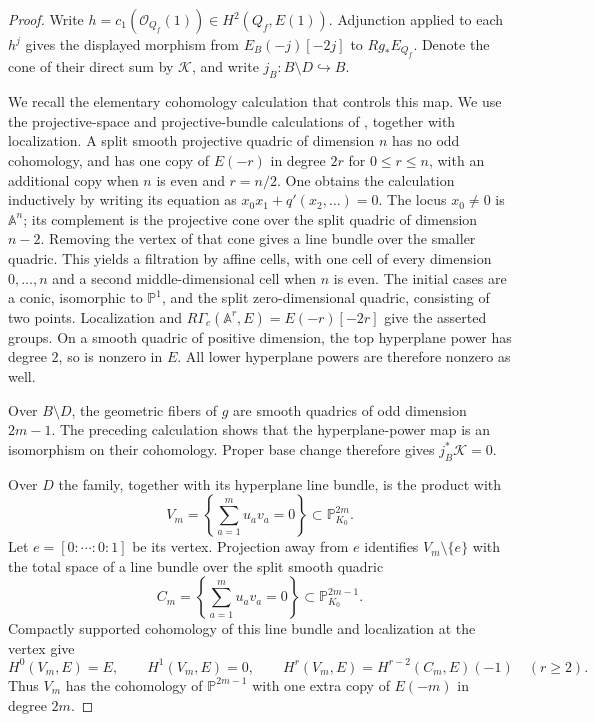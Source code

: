 \begin{proof}
Write $h=c_1(\mathcal O_{Q_f}(1))\in H^2(Q_f,E(1))$.
Adjunction applied to each $h^j$ gives the displayed morphism from
$E_B(-j)[-2j]$ to $Rg_*E_{Q_f}$.  Denote the cone of their direct sum
by $\mathcal K$, and write $j_B:B\setminus D\hookrightarrow B$.

We recall the elementary cohomology calculation that controls this map.
We use the projective-space and projective-bundle calculations of
\cite[Example~16.3 and Theorem~23.2]{MilneEtale}, together with localization.
A split smooth projective quadric of dimension $n$ has no odd
cohomology, and has one copy of $E(-r)$ in degree $2r$ for
$0\leq r\leq n$, with an additional copy when $n$ is even and
$r=n/2$.  One obtains the calculation inductively by writing its
equation as $x_0x_1+q'(x_2,\ldots)=0$.  The locus $x_0\ne0$ is
$\mathbb A^n$; its complement is the projective cone over the split
quadric of dimension $n-2$.  Removing the vertex of that cone gives a
line bundle over the smaller quadric.  This yields a filtration by
affine cells, with one cell of every dimension $0,\ldots,n$ and a
second middle-dimensional cell when $n$ is even.  The initial cases
are a conic, isomorphic to $\mathbb P^1$, and the split
zero-dimensional quadric, consisting of two points.  Localization and
$R\Gamma_c(\mathbb A^r,E)=E(-r)[-2r]$ give the asserted groups.
On a smooth quadric of positive dimension, the top hyperplane power
has degree $2$, so is nonzero in $E$.  All lower hyperplane powers are
therefore nonzero as well.

Over $B\setminus D$, the geometric fibers of $g$ are smooth quadrics
of odd dimension $2m-1$.  The preceding calculation shows that the
hyperplane-power map is an isomorphism on their cohomology.  Proper
base change therefore gives $j_B^*\mathcal K=0$.

Over $D$ the family, together with its hyperplane line bundle, is the
product with
\[
 V_m=\left\{\sum_{a=1}^{m}u_av_a=0\right\}
         \subset\mathbb P_{K_0}^{2m}.
\]
Let $e=[0:\cdots:0:1]$ be its vertex.  Projection away from $e$
identifies $V_m\setminus\{e\}$ with the total space of a line bundle
over the split smooth quadric
\[
 C_m=\left\{\sum_{a=1}^{m}u_av_a=0\right\}
         \subset\mathbb P_{K_0}^{2m-1}.
\]
Compactly supported cohomology of this line bundle and localization at
the vertex give
\begin{equation}\label{eq:slice-cone-cohomology}
 H^0(V_m,E)=E,\qquad H^1(V_m,E)=0,\qquad
 H^r(V_m,E)=H^{r-2}(C_m,E)(-1)\quad(r\geq2).
\end{equation}
Thus $V_m$ has the cohomology of $\mathbb P^{2m-1}$ with one extra
copy of $E(-m)$ in degree $2m$.


\end{proof}
